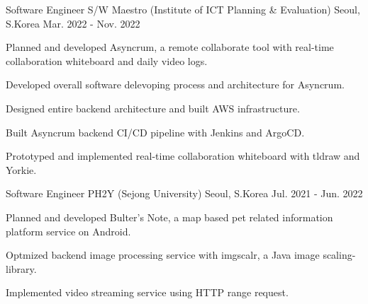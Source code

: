 \begin{cventries}
  \cventry
    {Software Engineer} %
    {S/W Maestro (Institute of ICT Planning \& Evaluation)} %
    {Seoul, S.Korea} %
    {Mar. 2022 - Nov. 2022} %
    {
      \begin{cvitems} %
        \item {Planned and developed Asyncrum, a remote collaborate tool with real-time collaboration whiteboard and daily video logs.}
        \item {Developed overall software delevoping process and architecture for Asyncrum.}
        \item {Designed entire backend architecture and built AWS infrastructure.}
        \item {Built Asyncrum backend CI/CD pipeline with Jenkins and ArgoCD.}
        \item {Prototyped and implemented real-time collaboration whiteboard with tldraw and Yorkie.}        
      \end{cvitems}
    }

  \cventry
    {Software Engineer} %
    {PH2Y (Sejong University)} %
    {Seoul, S.Korea} %
    {Jul. 2021 - Jun. 2022} %
    {
      \begin{cvitems} %
        \item {Planned and developed Bulter's Note, a map based pet related information platform service on Android.}
        \item {Optmized backend image processing service with imgscalr, a Java image scaling-library.}
        \item {Implemented video streaming service using HTTP range request.}
      \end{cvitems}
    }


\end{cventries}
